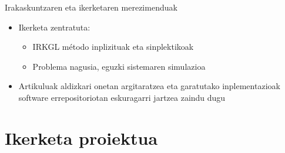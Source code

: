 \documentclass[
 10pt,%
 compress,%
 t,       %
 xcolor=svgnames
]{beamer}
\theoremstyle{definition} \newtheorem{definicion}{Definicion}[section]
\theoremstyle{propiedades} \newtheorem{propiedades}{Propiedades}[section]
\begin{document}
\begin{frame}{Irakaskuntzaren eta ikerketaren  merezimenduak}
{\begin{itemize}
\medskip
\item Ikerketa zentratuta:
\begin{itemize}
	\item IRKGL método inplizituak eta sinplektikoak
	\item Problema nagusia, eguzki sistemaren simulazioa
\end{itemize}

\medskip
\item Artikuluak aldizkari onetan argitaratzea eta garatutako inplementazioak software errepositoriotan eskuragarri jartzea zaindu dugu
\end{itemize}


}


\end{frame}




\section[Ikerketa proiektua]{Ikerketa proiektua}
\end{document}
